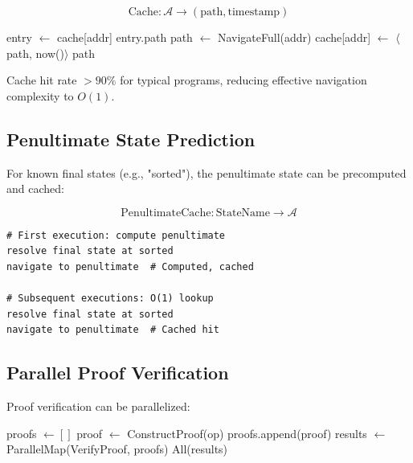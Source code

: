 \documentclass[twocolumn,10pt]{article}
\newcommand{\cataddr}{\mathcal{A}}
\theoremstyle{definition}
\theoremstyle{remark}
\begin{document}
\begin{equation}
    \text{Cache}: \cataddr \to (\text{path}, \text{timestamp})
\end{equation}

\begin{algorithm}
\caption{Navigate with Caching}
\begin{algorithmic}[1]
        \State entry $\gets$ cache[addr]
            \State \Return entry.path
        \EndIf
    \EndIf
    \State path $\gets$ NavigateFull(addr)
    \State cache[addr] $\gets$ $\langle$path, now()$\rangle$
    \State \Return path
\EndFunction
\end{algorithmic}
\end{algorithm}

Cache hit rate $> 90\%$ for typical programs, reducing effective navigation complexity to $O(1)$.

\subsection{Penultimate State Prediction}

For known final states (e.g., "sorted"), the penultimate state can be precomputed and cached:

\begin{equation}
    \text{PenultimateCache}: \text{StateName} \to \cataddr
\end{equation}

\begin{lstlisting}
# First execution: compute penultimate
resolve final state at sorted
navigate to penultimate  # Computed, cached

# Subsequent executions: O(1) lookup
resolve final state at sorted
navigate to penultimate  # Cached hit
\end{lstlisting}

\subsection{Parallel Proof Verification}

Proof verification can be parallelized:

\begin{algorithm}
\caption{Parallel Proof Verification}
\begin{algorithmic}[1]
    \State proofs $\gets []$
        \State proof $\gets$ ConstructProof(op)
        \State proofs.append(proof)
    \EndFor
    \State results $\gets$ ParallelMap(VerifyProof, proofs)
    \State \Return All(results)
\EndFunction
\end{algorithmic}
\end{algorithm}
\end{document}
